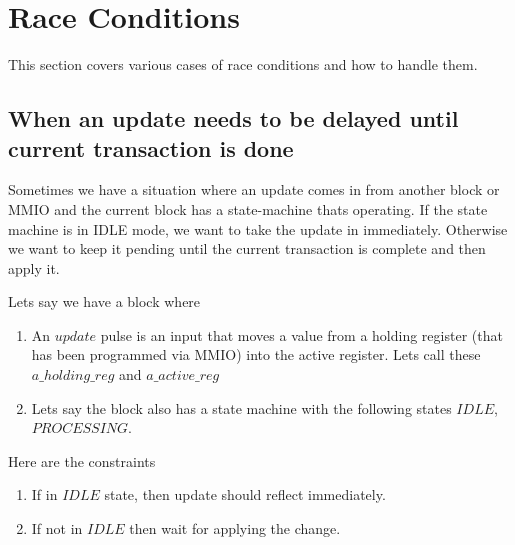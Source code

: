 \documentclass{article}
\begin{document}
\section{Race Conditions}
This section covers various cases of race conditions and how to handle them.
 
\subsection{When an update needs to be delayed until current transaction is done}
Sometimes we have a situation where an update comes in from another block or MMIO and the current block has a state-machine thats operating. If the state machine is in IDLE mode, we want to take the update in immediately. Otherwise we want to keep it pending until the current transaction is complete and then apply it. 

Lets say we have a block where
\begin{enumerate}
	\item An $update$ pulse is an input that moves a value from a holding register (that has been programmed via MMIO) into the active register. Lets call these $a\_holding\_reg$ and $a\_active\_reg$
	\item Lets say the block also has a state machine with the following states $IDLE$, $PROCESSING$.
\end{enumerate}

Here are the constraints
\begin{enumerate}
	\item If in $IDLE$ state, then update should reflect immediately.
	\item If not in $IDLE$ then wait for applying the change. 
\end{enumerate}
\end{document}
